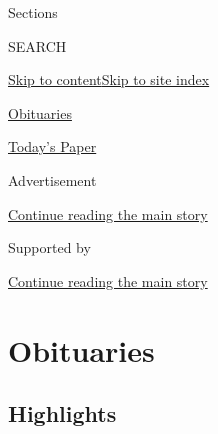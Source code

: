 Sections

SEARCH

\protect\hyperlink{site-content}{Skip to
content}\protect\hyperlink{site-index}{Skip to site index}

\href{https://www.nytimes.com/section/obituaries}{Obituaries}

\href{https://myaccount.nytimes.com/auth/login?response_type=cookie\&client_id=vi}{}

\href{https://www.nytimes.com/section/todayspaper}{Today's Paper}

Advertisement

\protect\hyperlink{after-top}{Continue reading the main story}

Supported by

\protect\hyperlink{after-sponsor}{Continue reading the main story}

\hypertarget{obituaries}{%
\section{Obituaries}\label{obituaries}}

\hypertarget{highlights}{%
\subsection{Highlights}\label{highlights}}


